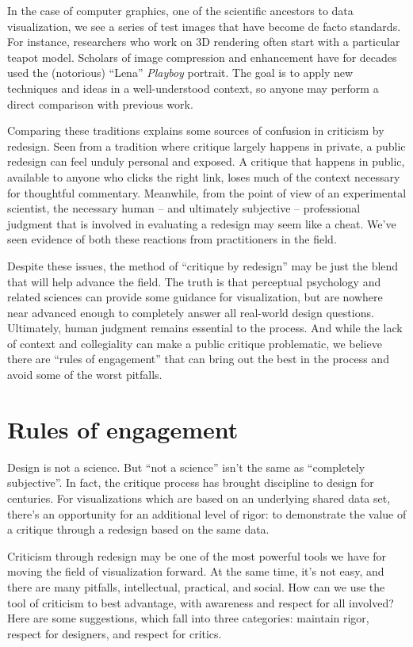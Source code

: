 \documentclass[sigconf,nonacm,screen,pbalance]{acmart}
\begin{document}
In the case of computer graphics, one of the scientific
ancestors to data visualization, we see a series of test images that have become de facto
standards. For instance, researchers who work on 3D rendering often start with a
particular teapot model. Scholars of image compression and enhancement have for decades
used the (notorious) ``Lena'' {\em Playboy} portrait. The goal is to apply new
techniques and ideas in a well-understood context, so anyone may perform a direct
comparison with previous work.

Comparing these traditions explains some sources of confusion
in criticism by redesign. Seen from a tradition where critique largely happens in private,
a public redesign can feel unduly personal and exposed. A critique that happens in public,
available to anyone who clicks the right link, loses much of the context necessary for
thoughtful commentary. Meanwhile, from the point of view of an experimental scientist, the
necessary human -- and ultimately subjective -- professional judgment that is involved in
evaluating a redesign may seem like a cheat. We've seen evidence of both these reactions
from practitioners in the field.

Despite these issues, the method of ``critique by redesign''
may be just the blend that will help advance the field. The truth is that perceptual
psychology and related sciences can provide some guidance for visualization, but are
nowhere near advanced enough to completely answer all real-world design questions.
Ultimately, human judgment remains essential to the process. And while the lack of context
and collegiality can make a public critique problematic, we believe there are ``rules of
engagement'' that can bring out the best in the process and avoid some of the worst
pitfalls.

\section{Rules of engagement}
Design is not a science. But ``not a science'' isn't the same
as ``completely subjective''. In fact, the critique process has brought discipline to design
for centuries. For visualizations which are based on an underlying shared data set,
there's an opportunity for an additional level of rigor: to demonstrate the value of a
critique through a redesign based on the same data.

Criticism through redesign may be one of the most powerful
tools we have for moving the field of visualization forward. At the same time, it's not
easy, and there are many pitfalls, intellectual, practical, and social. How can we use the
tool of criticism to best advantage, with awareness and respect for all involved? Here are
some suggestions, which fall into three categories: maintain rigor, respect for designers,
and respect for critics.
\end{document}
